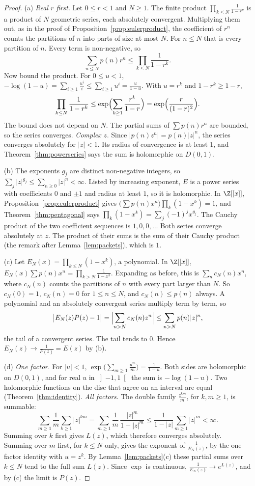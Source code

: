 \begin{proof}
(a) \emph{Real $r$ first.} Let $0\le r<1$ and $N\ge1$. The finite product $\prod_{k\le N}\frac1{1-r^k}$ is a product of $N$ geometric series, each absolutely convergent. Multiplying them out, as in the proof of Proposition~\ref{prop:eulerproduct}, the coefficient of $r^n$ counts the partitions of $n$ into parts of size at most $N$. For $n\le N$ that is every partition of $n$. Every term is non-negative, so
\[
\sum_{n\le N}p(n)r^n\le\prod_{k\le N}\frac1{1-r^k}.
\]
Now bound the product. For $0\le u<1$, $-\log(1-u)=\sum_{i\ge1}\frac{u^i}i\le\sum_{i\ge1}u^i=\frac u{1-u}$. With $u=r^k$ and $1-r^k\ge1-r$,
\[
\prod_{k\le N}\frac1{1-r^k}\le\exp\Bigl(\sum_{k\ge1}\frac{r^k}{1-r}\Bigr)=\exp\Bigl(\frac r{(1-r)^2}\Bigr).
\]
The bound does not depend on $N$. The partial sums of $\sum p(n)r^n$ are bounded, so the series converges. \emph{Complex $z$.} Since $|p(n)z^n|=p(n)|z|^n$, the series converges absolutely for $|z|<1$. Its radius of convergence is at least $1$, and Theorem~\ref{thm:powerseries} says the sum is holomorphic on $D(0,1)$.

(b) The exponents $g_j$ are distinct non-negative integers, so $\sum_j|z|^{g_j}\le\sum_{n\ge0}|z|^n<\infty$. Listed by increasing exponent, $E$ is a power series with coefficients $0$ and $\pm1$ and radius at least $1$, so it is holomorphic. In $\Z[[x]]$, Proposition~\ref{prop:eulerproduct} gives $\bigl(\sum p(n)x^n\bigr)\prod_k(1-x^k)=1$, and Theorem~\ref{thm:pentagonal} says $\prod_k(1-x^k)=\sum_j(-1)^jx^{g_j}$. The Cauchy product of the two coefficient sequences is $1,0,0,\dots$ Both series converge absolutely at $z$. The product of their sums is the sum of their Cauchy product (the remark after Lemma~\ref{lem:packets}), which is $1$.

(c) Let $E_N(x)=\prod_{k\le N}(1-x^k)$, a polynomial. In $\Z[[x]]$, $E_N(x)\sum p(n)x^n=\prod_{k>N}\frac1{1-x^k}$. Expanding as before, this is $\sum_nc_N(n)x^n$, where $c_N(n)$ counts the partitions of $n$ with every part larger than $N$. So $c_N(0)=1$, $c_N(n)=0$ for $1\le n\le N$, and $c_N(n)\le p(n)$ always. A polynomial and an absolutely convergent series multiply term by term, so
\[
\bigl|E_N(z)P(z)-1\bigr|=\Bigl|\sum_{n>N}c_N(n)z^n\Bigr|\le\sum_{n>N}p(n)|z|^n,
\]
the tail of a convergent series. The tail tends to $0$. Hence $E_N(z)\to\frac1{P(z)}=E(z)$ by (b).

(d) \emph{One factor.} For $|u|<1$, $\exp\bigl(\sum_{m\ge1}\frac{u^m}m\bigr)=\frac1{1-u}$. Both sides are holomorphic on $D(0,1)$, and for real $u$ in $\left]-1,1\right[$ the sum is $-\log(1-u)$. Two holomorphic functions on the disc that agree on an interval are equal (Theorem~\ref{thm:identity}). \emph{All factors.} The double family $\frac{z^{km}}m$, for $k,m\ge1$, is summable:
\[
\sum_{m\ge1}\frac1m\sum_{k\ge1}|z|^{km}=\sum_{m\ge1}\frac1m\,\frac{|z|^m}{1-|z|^m}\le\frac1{1-|z|}\sum_{m\ge1}|z|^m<\infty.
\]
Summing over $k$ first gives $L(z)$, which therefore converges absolutely. Summing over $m$ first, for $k\le N$ only, gives the exponent of $\frac1{E_N(z)}$, by the one-factor identity with $u=z^k$. By Lemma~\ref{lem:packets}(c) these partial sums over $k\le N$ tend to the full sum $L(z)$. Since $\exp$ is continuous, $\frac1{E_N(z)}\to e^{L(z)}$, and by (c) the limit is $P(z)$.


\end{proof}
